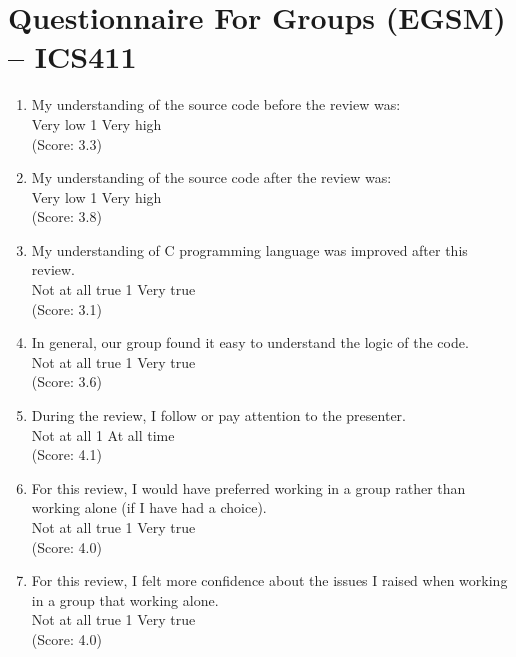
\chapter {Questionnaire For Groups (EGSM) -- ICS411}


\begin{enumerate}
\item My understanding of the source code before the review was: 
\\
Very low \hfill 1     \hfill Very high\\
(Score: 3.3)


\item My understanding of the source code after the review was: 
\\
Very low \hfill 1     \hfill Very high\\
(Score: 3.8)

\item My understanding of C programming language was improved after
this review.  
\\
Not at all true \hfill 1     \hfill Very true\\
(Score: 3.1)


\item In general, our group found it easy to understand the logic of
the code. 
\\
Not at all true \hfill 1     \hfill Very true\\
(Score: 3.6)

\item During the review, I follow or pay attention to the presenter.
\\
Not at all \hfill 1    
\hfill At all time\\
(Score: 4.1)

\item For this review, I would have preferred working in a group rather 
than working alone (if I have had a choice).
\\
Not at all true \hfill 1     \hfill Very true\\
(Score: 4.0)

\item For this review, I felt more confidence about the issues I raised when 
working in a group that working alone.
\\
Not at all true \hfill 1     \hfill Very true\\
(Score: 4.0)


\end{enumerate}
